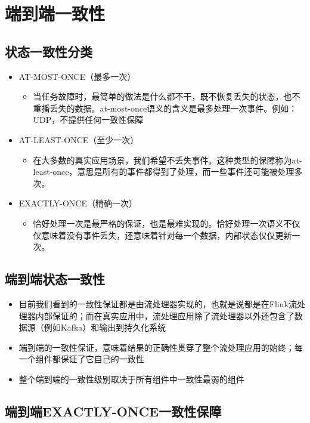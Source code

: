 \documentclass[cn,11pt,chinese]{elegantbook}
\begin{document}
\chapter{端到端一致性}

\section{状态一致性分类}

\begin{itemize}
  \item AT-MOST-ONCE（最多一次）
  \begin{itemize}
      \item 当任务故障时，最简单的做法是什么都不干，既不恢复丢失的状态，也不重播丢失的数据。at-most-once语义的含义是最多处理一次事件。例如：UDP，不提供任何一致性保障
  \end{itemize}
  \item AT-LEAST-ONCE（至少一次）
  \begin{itemize}
      \item 在大多数的真实应用场景，我们希望不丢失事件。这种类型的保障称为at-least-once，意思是所有的事件都得到了处理，而一些事件还可能被处理多次。
  \end{itemize}
  \item EXACTLY-ONCE（精确一次）
  \begin{itemize}
      \item 恰好处理一次是最严格的保证，也是最难实现的。恰好处理一次语义不仅仅意味着没有事件丢失，还意味着针对每一个数据，内部状态仅仅更新一次。
  \end{itemize}
\end{itemize}

\section{端到端状态一致性}

\begin{itemize}
  \item 目前我们看到的一致性保证都是由流处理器实现的，也就是说都是在Flink流处理器内部保证的；而在真实应用中，流处理应用除了流处理器以外还包含了数据源（例如Kafka）和输出到持久化系统
  \item 端到端的一致性保证，意味着结果的正确性贯穿了整个流处理应用的始终；每一个组件都保证了它自己的一致性
  \item 整个端到端的一致性级别取决于所有组件中一致性最弱的组件
\end{itemize}

\section{端到端EXACTLY-ONCE一致性保障}
\end{document}
